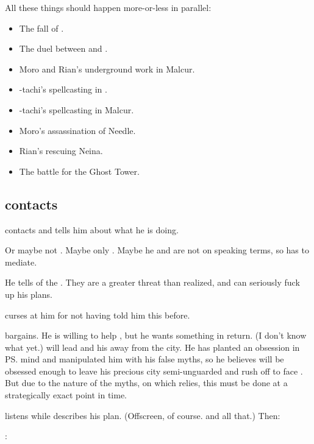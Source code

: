 \begin{garbage}
All these things should happen more-or-less in parallel:
\begin{itemize}
  \item The fall of \Forklin. 
  \item The duel between \Teshrial{} and \Ishnaruchaefir. 
  \item Moro and Rian's underground work in Malcur. 
  \item \Takestsha-tachi's spellcasting in \Forklin. 
  \item \Psyrex-tachi's spellcasting in Malcur. 
  \item Moro's assassination of Needle. 
  \item Rian's rescuing Neina.  
  \item The battle for the Ghost Tower. 
\end{itemize}









\subsection{\Ishnaruchaefir{} contacts \Secherdamon}
\Ishnaruchaefir{} contacts \Secherdamon{} and tells him about what he is doing. 

Or maybe not \Secherdamon.
Maybe only \LocarPsyrex. 
Maybe he and \Secherdamon{} are not on speaking terms, so \Psyrex{} has to mediate. 

He tells \Psyrex{} of the . 
They are a greater threat than \Psyrex{} realized, and can seriously fuck up his plans. 

\Psyrex{} curses at him for not having told him this before.

\Ishnaruchaefir{} bargains. 
He is willing to help \Psyrex, but he wants something in return. 
(I don't know what yet.) 
\Ishnaruchaefir{} will lead \Teshrial{} and his \ghobaleth{} away from the city. 
He has planted an obsession in \ps{\Teshrial} mind and manipulated him with his false myths, so he believes \Teshrial{} will be obsessed enough to leave his precious city semi-unguarded and rush off to face \Ishnaruchaefir. 
But due to the nature of the myths, on which \Teshrial{} relies, this must be done at a strategically exact point in time. 

\Psyrex{} listens while \Ishnaruchaefir{} describes his plan. 
(Offscreen, of course. 
  and all that.)
Then:
\begin{prose}
  \Psyrex:  
  

\end{prose}
\end{garbage}
